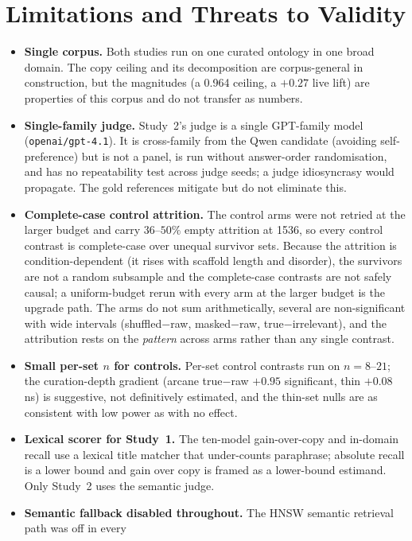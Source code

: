 \documentclass[10pt,twocolumn]{article}
\begin{document}
\section{Limitations and Threats to Validity}\label{sec:limits}
\begin{itemize}[topsep=2pt,itemsep=2pt,leftmargin=1.4em]
\item \textbf{Single corpus.} Both studies run on one curated ontology in one broad domain. The copy
ceiling and its decomposition are corpus-general in construction, but the magnitudes (a 0.964 ceiling,
a $+0.27$ live lift) are properties of this corpus and do not transfer as numbers.
\item \textbf{Single-family judge.} Study~2's judge is a single GPT-family model
(\texttt{openai/gpt-4.1}). It is cross-family from the Qwen candidate (avoiding self-preference) but is
not a panel, is run without answer-order randomisation, and has no repeatability test across judge
seeds; a judge idiosyncrasy would propagate. The gold references mitigate but do not eliminate this.
\item \textbf{Complete-case control attrition.} The control arms were not retried at the larger budget
and carry $36$--$50\%$ empty attrition at 1536, so every control contrast is complete-case over unequal
survivor sets. Because the attrition is condition-dependent (it rises with scaffold length and
disorder), the survivors are not a random subsample and the complete-case contrasts are not safely
causal; a uniform-budget rerun with every arm at the larger budget is the upgrade path. The arms do not
sum arithmetically, several are non-significant with wide intervals (shuffled$-$raw, masked$-$raw,
true$-$irrelevant), and the attribution rests on the \emph{pattern} across arms rather than any single
contrast.
\item \textbf{Small per-set $n$ for controls.} Per-set control contrasts run on $n=8$--$21$; the
curation-depth gradient (arcane true$-$raw $+0.95$ significant, thin $+0.08$ ns) is suggestive, not
definitively estimated, and the thin-set nulls are as consistent with low power as with no effect.
\item \textbf{Lexical scorer for Study~1.} The ten-model gain-over-copy and in-domain recall use a
lexical title matcher that under-counts paraphrase; absolute recall is a lower bound and gain over copy
is framed as a lower-bound estimand. Only Study~2 uses the semantic judge.
\item \textbf{Semantic fallback disabled throughout.} The HNSW semantic retrieval path was off in every

\end{itemize}
\end{document}
